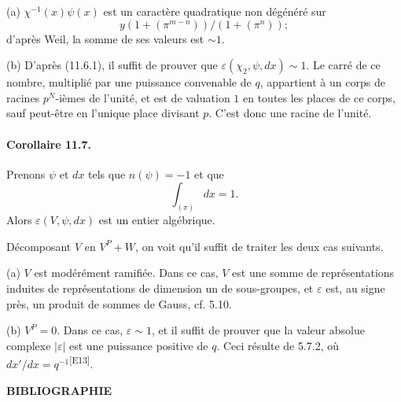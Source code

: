 \documentclass[10pt,letterpaper]{article}
\newcommand{\auditmark}[1]{\textsuperscript{\normalfont\scriptsize[E#1]}}
\begin{document}
(a) \(\chi^{-1}(x)\psi(x)\) est un caractère quadratique non dégénéré sur
\[
y(1+(\pi^{m-n}))/(1+(\pi^n));
\]
d'après Weil, la somme de ses valeurs est \(\sim1\).

(b) D'après (11.6.1), il suffit de prouver que \(\varepsilon(\chi_2,\psi,dx)\sim1\). Le carré de ce nombre, multiplié par une puissance convenable de \(q\), appartient à un corps de racines \(p^N\)-ièmes de l'unité, et est de valuation \(1\) en toutes les places de ce corps, sauf peut-être en l'unique place divisant \(p\). C'est donc une racine de l'unité.

\paragraph{Corollaire 11.7.} Prenons \(\psi\) et \(dx\) tels que \(n(\psi)=-1\) et que
\[
\int_{(\pi)}dx=1.
\]
Alors \(\varepsilon(V,\psi,dx)\) est un entier algébrique.

Décomposant \(V\) en \(V^P+W\), on voit qu'il suffit de traiter les deux cas suivants.

(a) \(V\) est modérément ramifiée. Dans ce cas, \(V\) est une somme de représentations induites de représentations de dimension un de sous-groupes, et \(\varepsilon\) est, au signe près, un produit de sommes de Gauss, cf. 5.10.

(b) \(V^P=0\). Dans ce cas, \(\varepsilon\sim1\), et il suffit de prouver que la valeur absolue complexe \(|\varepsilon|\) est une puissance positive de \(q\). Ceci résulte de 5.7.2, où \(dx'/dx=q^{-1}\)\auditmark{13}.


\begin{center}
\bfseries BIBLIOGRAPHIE
\end{center}
\end{document}
